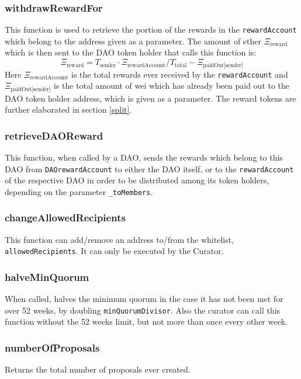 \documentclass[9pt,oneside]{amsart}
\begin{document}
\begin{multicols}{2}
\subsubsection*{withdrawRewardFor}
This function is used to retrieve the portion of the rewards in the \verb|rewardAccount| which belong to the address given as a parameter.
The amount of ether $\Xi_{\text{reward}}$ which is then sent to the DAO token holder that calls this function is:
\begin{equation}
\Xi_{\text{reward}} = T_{\text{sender}} \cdot \Xi_{\text{rewardAccount}} / T_{\text{total}} - \Xi_{\text{paidOut[sender]}}
\end{equation}
Here $\Xi_{\text{rewardAccount}}$ is the total rewards ever received by the \verb|rewardAccount| and $\Xi_{\text{paidOut[sender]}}$ is the total amount of wei which has already been paid out to the DAO token holder address, which is given as a parameter. The reward tokens are further elaborated in section \ref{split}.

\subsubsection*{retrieveDAOReward}
This function, when called by a DAO, sends the rewards which belong to this DAO from \verb|DAOrewardAccount| to either the DAO itself, or to the \verb|rewardAccount| of the respective DAO in order to be distributed among its token holders, depending on the parameter \verb|_toMembers|.

\subsubsection*{changeAllowedRecipients}
This function can add/remove an address to/from the whitelist, \verb|allowedRecipients|. It can only be executed by the Curator.

\subsubsection*{halveMinQuorum}
When called, halves the minimum quorum in the case it has not been met for over 52 weeks, by doubling \verb|minQuorumDivisor|. Also the curator can call this function without the 52 weeks limit, but not more than once every other week.

\subsubsection*{numberOfProposals}
Returns the total number of proposals ever created.


\end{multicols}
\end{document}
